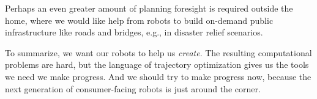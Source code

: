 Perhaps an even greater amount of planning foresight is required outside the home, where we would like help from robots to build on-demand public infrastructure like roads and bridges, e.g., in disaster relief scenarios.

To summarize, we want our robots to help us \emph{create}.
The resulting computational problems are hard, but the language of trajectory optimization gives us the tools we need we make progress.
And we should try to make progress now, because the next generation of consumer-facing robots is just around the corner.
